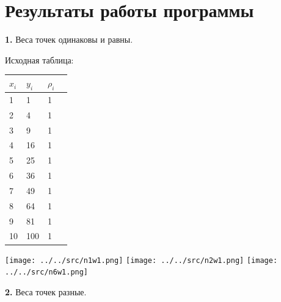 \documentclass[a4paper,12pt]{article}
\begin{document}
\clearpage %

\section{Результаты работы программы}
\noindent\textbf{1.} Веса точек одинаковы и равны.

\begin{center}
Исходная таблица: 

\begin{center}
	\begin{tabular}{ | l | l | l | p{1cm} |}
		\hline
		$x_{i}$ & $y_{i}$ & $\rho_{i}$ \\ \hline
		1 & 1 & 1 \\ \hline
		2 & 4 & 1 \\ \hline
		3 & 9 & 1 \\ \hline
		4 & 16 & 1 \\ \hline
		5 & 25 & 1 \\ \hline
		6 & 36 & 1 \\ \hline
		7 & 49 & 1 \\ \hline
		8 & 64 & 1 \\ \hline
		9 & 81 & 1 \\ \hline					
		10 & 100 & 1 \\
		\hline
	\end{tabular}
\end{center}

\texttt{[image: ../../src/n1w1.png]} \newline
\texttt{[image: ../../src/n2w1.png]} \newline
\texttt{[image: ../../src/n6w1.png]} \newline
\end{center}

\clearpage
\noindent\textbf{2.} Веса точек разные.
\end{document}
